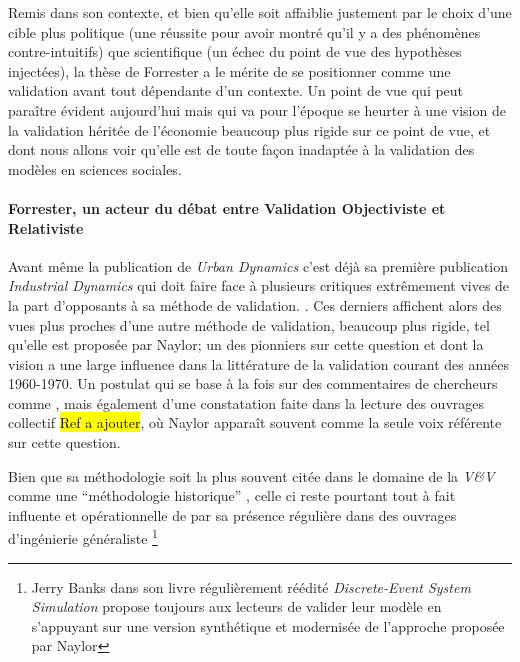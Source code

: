 Remis dans son contexte, et bien qu'elle soit affaiblie justement par le choix d'une cible plus politique (une réussite pour avoir montré qu'il y a des phénomènes contre-intuitifs) que scientifique (un échec du point de vue des hypothèses injectées), la thèse de Forrester a le mérite de se positionner comme une validation avant tout dépendante d'un contexte. Un point de vue qui peut paraître évident aujourd'hui mais qui va pour l'époque se heurter à une vision de la validation héritée de l'économie beaucoup plus rigide sur ce point de vue, et dont nous allons voir qu'elle est de toute façon inadaptée à la validation des modèles en sciences sociales.


\paragraph{Forrester, un acteur du débat entre Validation Objectiviste et Relativiste}
\label{p:confrontation_approches}

Avant même la publication de \textit{Urban Dynamics} c'est déjà sa première publication \textit{Industrial Dynamics} qui doit faire face à plusieurs critiques extrêmement vives de la part d'opposants à sa méthode de validation. \autocite{Barlas1990}. Ces derniers affichent alors des vues plus proches d'une autre méthode de validation, beaucoup plus rigide, tel qu'elle est proposée par Naylor; un des pionniers sur cette question et dont la vision a une large influence dans la littérature de la validation courant des années 1960-1970. Un postulat qui se base à la fois sur des commentaires de chercheurs comme \autocite[1088]{Kleindorfer1998} \autocite{Nance2002}, mais également d'une constatation faite dans la lecture des ouvrages collectif \hl{Ref a ajouter}, où Naylor apparaît souvent comme la seule voix référente sur cette question.

Bien que sa méthodologie soit la plus souvent citée dans le domaine de la \textit{V\&V} comme une \enquote{méthodologie historique} \autocite{Sargent2010}, celle ci reste pourtant tout à fait influente et opérationnelle de par sa présence régulière dans des ouvrages d'ingénierie généraliste \footnote{Jerry Banks dans son livre régulièrement réédité \textit{Discrete-Event System Simulation} propose toujours aux lecteurs de valider leur modèle en s'appuyant sur une version synthétique et modernisée de l'approche proposée par Naylor}

